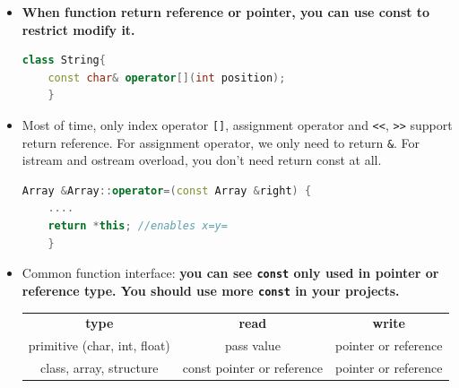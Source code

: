 \documentclass[a4paper,11pt,twoside]{book}
\renewcommand{\hline}{}
\begin{document}
\begin{itemize}
	\item \textbf{When function return reference or pointer, you can use const to restrict modify it.}
	\begin{lstlisting}[frame=single, language=c++]
	class String{
	const char& operator[](int position);
	}
	\end{lstlisting}
	
	\item Most of time, only index operator \verb=[]=, assignment operator and \verb|<<|, \verb|>>| support return reference. For assignment operator, we only need to return \texttt{\&}.  For istream and ostream overload, you don't need return const at all. 
	\begin{lstlisting}[frame=single, language=c++]
	Array &Array::operator=(const Array &right) {
	....
	return *this; //enables x=y= 
	}
	\end{lstlisting} 
	
	\item Common function interface: \textbf{you can see \texttt{const} only used in pointer or reference type. You should use more \texttt{const} in your projects. }
	
	\begin{tabular}{|c|c|c|}
		\hline
		\textbf{type} & \textbf{read} & \textbf{write} \\
		\hline
		primitive (char, int, float) & pass value & pointer or reference \\
		\hline
		class, array, structure  & const pointer or reference &  pointer or reference  \\
		\hline
	\end{tabular}
	
\end{itemize}
\end{document}
